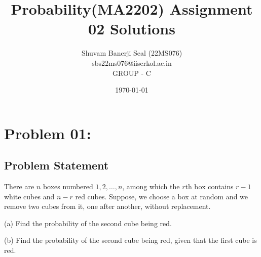 \documentclass{article}
\title{Probability(MA2202) Assignment 02 Solutions}
\author{Shuvam Banerji Seal (22MS076)\\ \small sbs22ms076@iiserkol.ac.in \\ GROUP - C}
\date{\today} %
\theoremstyle{definition}
\begin{document}
\maketitle

\section{Problem 01:}
\begin{mdframed}[style = MyFrame]
\subsection{Problem Statement}
    There are $n$ boxes numbered $1,2,\ldots,n$, among which the $r$th box contains $r - 1$ white cubes and $n - r$ red cubes. Suppose, we choose a box at random and we remove two cubes from it, one after another, without replacement.

(a) Find the probability of the second cube being red.

(b) Find the probability of the second cube being red, given that the first cube is red.
\end{mdframed}
\end{document}
